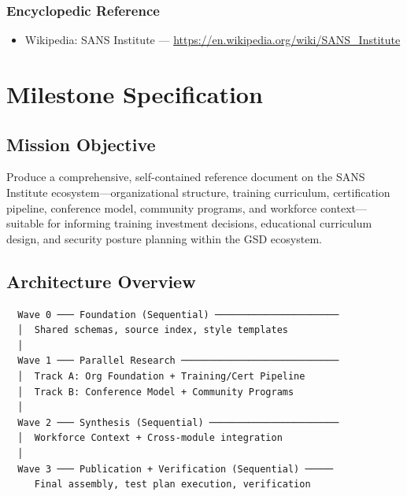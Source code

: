 \documentclass[11pt,letterpaper]{article}
\newcommand{\stageheader}[2]{%
  \noindent\colorbox{#2}{\makebox[\textwidth][l]{%
    \textcolor{white}{\bfseries\sffamily\hspace{6pt}#1\hspace{6pt}}}}%
  \vspace{0.5em}\par%
}
\begin{document}
\subsubsection{Encyclopedic Reference}
\begin{itemize}[nosep]
  \item Wikipedia: SANS Institute --- \url{https://en.wikipedia.org/wiki/SANS_Institute}
\end{itemize}

\newpage

\stageheader{STAGE 3 --- MISSION PACKAGE}{tertiary}

\section{Milestone Specification}

\subsection{Mission Objective}

Produce a comprehensive, self-contained reference document on the SANS Institute ecosystem---organizational structure, training curriculum, certification pipeline, conference model, community programs, and workforce context---suitable for informing training investment decisions, educational curriculum design, and security posture planning within the GSD ecosystem.

\subsection{Architecture Overview}

\begin{asciibox}
\begin{verbatim}
  Wave 0 ─── Foundation (Sequential) ──────────────────────
  │  Shared schemas, source index, style templates
  │
  Wave 1 ─── Parallel Research ────────────────────────────
  │  Track A: Org Foundation + Training/Cert Pipeline
  │  Track B: Conference Model + Community Programs
  │
  Wave 2 ─── Synthesis (Sequential) ───────────────────────
  │  Workforce Context + Cross-module integration
  │
  Wave 3 ─── Publication + Verification (Sequential) ─────
     Final assembly, test plan execution, verification
\end{verbatim}
\end{asciibox}
\end{document}
